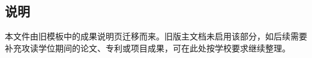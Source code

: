 
\begin{resume}

  \subsection*{说明}

  \begin{achievements}
    \item 本文件由旧模板中的成果说明页迁移而来。旧版主文档未启用该部分，如后续需要补充攻读学位期间的论文、专利或项目成果，可在此处按学校要求继续整理。
  \end{achievements}

\end{resume}
